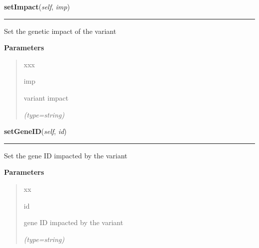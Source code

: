 \hspace{.8\funcindent}\begin{boxedminipage}{\funcwidth}

    \raggedright \textbf{setImpact}(\textit{self}, \textit{imp})

    \vspace{-1.5ex}

    \rule{\textwidth}{0.5\fboxrule}
\setlength{\parskip}{2ex}
    Set the genetic impact of the variant

\setlength{\parskip}{1ex}
      \textbf{Parameters}
      \vspace{-1ex}

      \begin{quote}
        \begin{Ventry}{xxx}

          \item[imp]

          variant impact

            {\it (type=string)}

        \end{Ventry}

      \end{quote}

    \end{boxedminipage}

    \label{script-phyloFixedVar:var:setGeneID}

    \vspace{0.5ex}

\hspace{.8\funcindent}\begin{boxedminipage}{\funcwidth}

    \raggedright \textbf{setGeneID}(\textit{self}, \textit{id})

    \vspace{-1.5ex}

    \rule{\textwidth}{0.5\fboxrule}
\setlength{\parskip}{2ex}
    Set the gene ID impacted by the variant

\setlength{\parskip}{1ex}
      \textbf{Parameters}
      \vspace{-1ex}

      \begin{quote}
        \begin{Ventry}{xx}

          \item[id]

          gene ID impacted by the variant

            {\it (type=string)}

        \end{Ventry}

      \end{quote}

    \end{boxedminipage}

